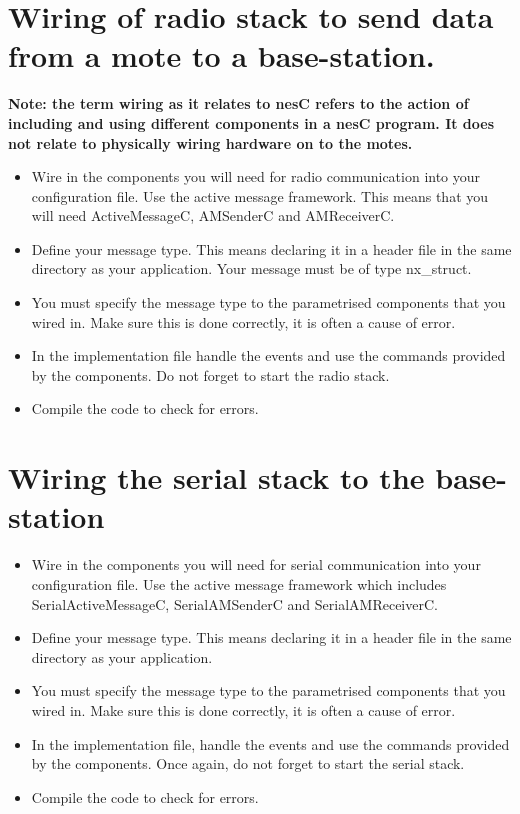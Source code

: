 \documentclass [a4] {article}
\begin{document}
\section{Wiring of radio stack to send data from a mote to a base-station.}

{\bf Note: the term wiring as it relates to nesC refers to the action of including and using different components in a nesC program. It does not relate to physically wiring hardware on to the motes. }

\begin{itemize}

\item Wire in the components you will need for radio communication into your configuration file. Use the active message framework. This means that you will need ActiveMessageC, AMSenderC and AMReceiverC.

\item Define your message type. This means declaring it in a header file in the same directory as your application. Your message must be of type nx\_struct.

\item You must specify the message type to the parametrised components that you wired in. Make sure this is done correctly, it is often a cause of error.

\item In the implementation file handle the events and use the commands provided by the components. Do not forget to start the radio stack.

\item Compile the code to check for errors.

\end{itemize}

\section{Wiring the serial stack to the base-station}

\begin{itemize}

\item Wire in the components you will need for serial communication into your configuration file. Use the active message framework which includes SerialActiveMessageC, SerialAMSenderC and SerialAMReceiverC.

\item Define your message type. This means declaring it in a header file in the same directory as your application.

\item You must specify the message type to the parametrised components that you wired in. Make sure this is done correctly, it is often a cause of error.

\item In the implementation file, handle the events and use the commands provided by the components. Once again, do not forget to start the serial stack.

\item Compile the code to check for errors.

\end{itemize}
\end{document}
